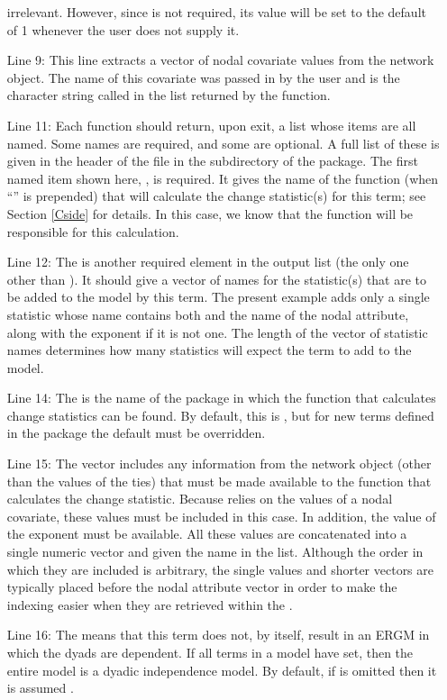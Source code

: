 \documentclass[nojss]{jss}
\begin{document}
\begin{itemize}
irrelevant.  However, since  is not required, its value will be set to the
default of 1 whenever the user does not supply it.
\item[Line 9:] This line extracts a vector of nodal covariate
values from the network object.  The name of this covariate was passed in by the
user and is the character string called  in the list returned by the
 function.
\item[Line 11:]  Each  function should return, upon exit,
a list whose items are all named.  Some names are required, and some
are optional.  A full list of these is given in the header of the 
file in the  subdirectory of the  package.
The first named item shown here, , is required.  It gives the name
of the  function (when ``'' is prepended) that will calculate the
change statistic(s) for this term; see Section \ref{Cside} for details.  In this case,
we know that the function  will be responsible for this calculation.
\item [Line 12:]  The  is another required element in the output
list (the only one other than ).  It should give a vector of names
for the statistic(s) that are to be added to the model by this term.  The present
example adds only a single statistic whose name contains
both  and the name of the nodal attribute, along with the exponent
 if it is not one.  The length of the vector of statistic names determines how
many statistics  will expect the term to add to the model.
\item [Line 14:]
The  is the name of the  package in which the
 function that calculates change statistics can be found.  By default,
this is , but for new terms defined in the  package
the default must be overridden.
\item [Line 15:]
The  vector includes any information from the network object (other than the values of the ties) that must be made available to the  function that calculates the change statistic.  Because  relies on the values of a nodal covariate, these values must be included in this case. In addition, the value of the
 exponent must be available.  All these values
are concatenated into a single numeric vector and given the name  in the
list. Although the order in which they are included is arbitrary, the single values and shorter vectors are typically placed before the nodal attribute vector in order to make the indexing easier when they are retrieved within the .
\item[Line 16:]  The  means that this term does not, by itself,
result in an ERGM in which the dyads are dependent.   If all terms in a model
have  set, then the entire model is a dyadic independence
model.  By default, if  is omitted then it is assumed .
\end{itemize}
\end{document}
